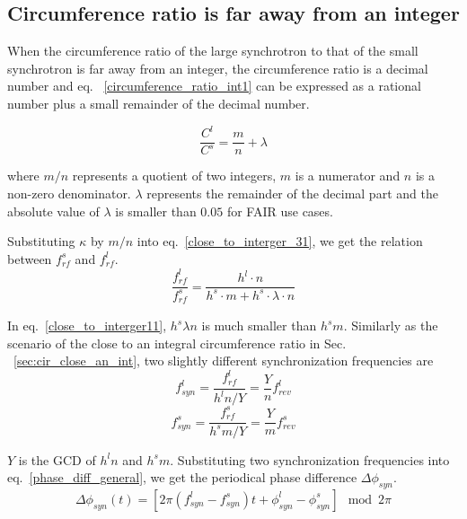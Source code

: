 \subsection{Circumference ratio is far away from an integer}
When the circumference ratio of the large synchrotron to that of the small synchrotron is far away from an integer, the circumference ratio is a decimal number and eq. ~\ref{circumference_ratio_int1} can be expressed as a rational number plus a small remainder of the decimal number.

\begin{equation}
\frac{C^l}{C^s}=\frac{m}{n}+ \lambda \label{circumference_ratio_noint11}
\end{equation}

where $m/n$ represents a quotient of two integers, $m$ is a numerator and $n$ is a non-zero denominator. $\lambda$ represents the remainder of the decimal part and the absolute value of $\lambda$ is smaller than $0.05$ for FAIR use cases.   


Substituting $\kappa$ by $m/n$ into eq.~\ref{close_to_interger_31}, we get the relation between $f_{\mathit{rf}}^{s}$ and $f_{\mathit{rf}}^{l}$.
\begin{equation} 
\frac{f_{\mathit{rf}}^{l}}{f_{\mathit{rf}}^{s}}=\frac{h^l\cdot n}{h^s \cdot m+ h^s \cdot\lambda\cdot n}\label{close_to_interger11}
\end{equation}

In eq.~\ref{close_to_interger11}, $h^s\lambda n $ is much smaller than $h^s m$. Similarly as the scenario of the close to an integral circumference ratio in Sec. ~\ref{sec:cir_close_an_int}, two slightly different synchronization frequencies are 
\begin{equation}
f_{\mathit{syn}}^{l}=\frac{f_{\mathit{rf}}^{l}}{h^{l}n/Y}=\frac{Y}{n}f_{\mathit{rev}}^{l} \label{synch_freq111}
\end{equation}
\begin{equation}
f_{\mathit{syn}}^{s}=\frac{f_{\mathit{rf}}^{s}}{h^{s}m/Y}=\frac{Y}{m}f_{\mathit{rev}}^{s} \label{synch_freq222}
\end{equation}

$Y$ is the GCD of $h^l n$ and $h^s m$. Substituting two synchronization frequencies into eq.~\ref{phase_diff_general}, we get the periodical phase difference $\Delta \phi_\mathit{syn}$.
\begin{equation}
	\Delta \phi_\mathit{syn}(t)=[2\pi(f_{\mathit{syn}}^{l}-f_{\mathit{syn}}^{s})t+\phi_\mathit{syn}^l-\phi^s_\mathit{syn}] \mod 2\pi \label{phase_diff_general11}
\end{equation}

